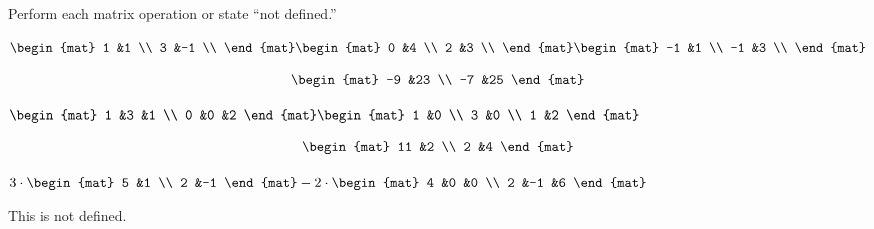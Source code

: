 \documentclass[11pt,answers]{examjh}
\begin{document}
\begin{questions}
\question
Perform each matrix operation or state ``not defined.''
\begin{parts}
\item
$
  \begin{mat}
    1 &1 \\
    3 &-1 \\
  \end{mat}
  \begin{mat}
     0 &4 \\
     2 &3 \\
  \end{mat}
  \begin{mat}
    -1 &1 \\
    -1 &3 \\
  \end{mat}
  $
\begin{solution}[1.5in]
  \begin{equation*}
  \begin{mat}
  -9 &23 \\
  -7 &25
  \end{mat}
  \end{equation*}
\end{solution}    
\item
$
\begin{mat}
1 &3 &1 \\
0 &0 &2
\end{mat}
\begin{mat}
1 &0 \\
3 &0 \\
1 &2
\end{mat}
$
\begin{solution}[1.25in]
  \begin{equation*}
  \begin{mat}
  11 &2 \\
  2 &4
    \end{mat}
  \end{equation*}
\end{solution}    
\item
$
3\cdot\begin{mat}
5 &1 \\
2 &-1
\end{mat}
-2\cdot
\begin{mat}
4 &0  &0  \\
2 &-1 &6
\end{mat}
$  
\begin{solution}[1in]
This is not defined.
\end{solution}    
\end{parts}


\end{questions}
\end{document}
